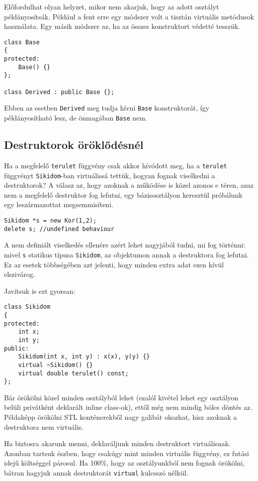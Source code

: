 \documentclass[a4paper,11.5pt,table]{article}
\begin{document}
	\medskip
	Előfordulhat olyan helyzet, mikor nem akarjuk, hogy az adott osztályt példányosítsák. Például a fent erre egy módszer volt a tisztán virtuális metódusok használata. Egy másik módszer az, ha az összes konstruktort védetté tesszük.
	\begin{lstlisting}
class Base
{
protected:
	Base() {}
};

class Derived : public Base {};
	\end{lstlisting}
	Ebben az esetben \texttt{Derived} meg tudja hívni \texttt{Base} konstruktorát, így példányosítható lesz, de önmagában \texttt{Base} nem.
	\subsection{Destruktorok öröklődésnél}
	Ha a megfelelő \texttt{terulet} függvény csak akkor hívódott meg, ha a \texttt{terulet} függvényt \texttt{Sikidom}-ban virtuálissá tettük, hogyan fognak viselkedni a destruktorok? A válasz az, hogy azoknak a működése is közel azonos e téren, azaz nem a megfelelő destruktor fog lefutni, egy bázisosztályon keresztül próbálunk egy leszármazottat megsemmisíteni.
	\begin{lstlisting}
Sikidom *s = new Kor(1,2);
delete s; //undefined behaviour
	\end{lstlisting}
	A nem definiált viselkedés ellenére azért lehet nagyjából tudni, mi fog történni: mivel \texttt{s} statikus típusa \texttt{Sikidom}, az objektumon annak a destruktora fog lefutni. Ez az esetek többségében azt jelenti, hogy minden extra adat ezen kívül elszivárog.
	
	Javítsuk is ezt gyorsan:
\begin{lstlisting}
class Sikidom
{
protected:
	int x;
	int y;
public:
	Sikidom(int x, int y) : x(x), y(y) {}
	virtual ~Sikidom() {}
	virtual double terulet() const;
};
\end{lstlisting}
	Bár örökölni közel minden osztályból lehet (ezalól kivétel lehet egy osztályon belüli privátként deklarált inline class-ok), ettől még nem mindig bölcs döntés az. Példaképp örökölni STL konténerekből nagy galibát okozhat, hisz azoknak a destruktora nem virtuális.
	
	\medskip
	Ha biztosra akarunk menni, deklaráljunk minden destruktort virtuálisnak. Azonban tartsuk észben, hogy csakúgy mint minden virtuális függvény, ez futási idejű költséggel párosul. Ha 100\%, hogy az osztályunkból nem fognak örökölni, bátran hagyjuk annak destruktorát \texttt{virtual} kulcsszó nélkül.
	
\end{document}

